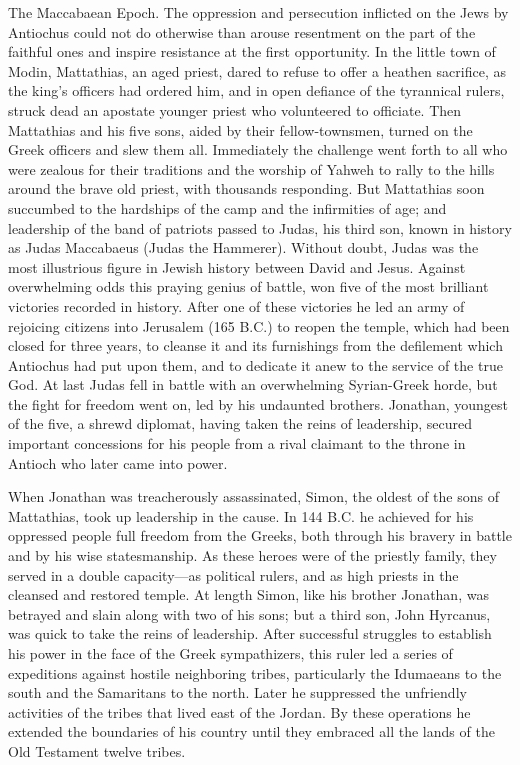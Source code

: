 The Maccabaean Epoch. The oppression and persecution inflicted on the Jews by Antiochus could not do otherwise than arouse resentment on the part of the faithful ones and inspire resistance at the first opportunity. In the little town of Modin, Mattathias, an aged priest, dared to refuse to offer a heathen sacrifice, as the king's officers had ordered him, and in open defiance of the tyrannical rulers, struck dead an apostate younger priest who volunteered to officiate. Then Mattathias and his five sons, aided by their fellow-townsmen, turned on the Greek officers and slew them all. Immediately the challenge went forth to all who were zealous for their traditions and the worship of Yahweh to rally to the hills around the brave old priest, with thousands responding. But Mattathias soon succumbed to the hardships of the camp and the infirmities of age; and leadership of the band of patriots passed to Judas, his third son, known in history as Judas Maccabaeus (Judas the Hammerer). Without doubt, Judas was the most illustrious figure in Jewish history between David and Jesus. Against overwhelming odds this praying genius of battle, won five of the most brilliant victories recorded in history. After one of these victories he led an army of rejoicing citizens into Jerusalem (165 B.C.) to reopen the temple, which had been closed for three years, to cleanse it and its furnishings from the defilement which Antiochus had put upon them, and to dedicate it anew to the service of the true God. At last Judas fell in battle with an overwhelming Syrian-Greek horde, but the fight for freedom went on, led by his undaunted brothers. Jonathan, youngest of the five, a shrewd diplomat, having taken the reins of leadership, secured important concessions for his people from a rival claimant to the throne in Antioch who later came into power.

When Jonathan was treacherously assassinated, Simon, the oldest of the sons of Mattathias, took up leadership in the cause. In 144 B.C. he achieved for his oppressed people full freedom from the Greeks, both through his bravery in battle and by his wise statesmanship. As these heroes were of the priestly family, they served in a double capacity---as political rulers, and as high priests in the cleansed and restored temple. At length Simon, like his brother Jonathan, was betrayed and slain along with two of his sons; but a third son, John Hyrcanus, was quick to take the reins of leadership. After successful struggles to establish his power in the face of the Greek sympathizers, this ruler led a series of expeditions against hostile neighboring tribes, particularly the Idumaeans to the south and the Samaritans to the north. Later he suppressed the unfriendly activities of the tribes that lived east of the Jordan. By these operations he extended the boundaries of his country until they embraced all the lands of the Old Testament twelve tribes.

